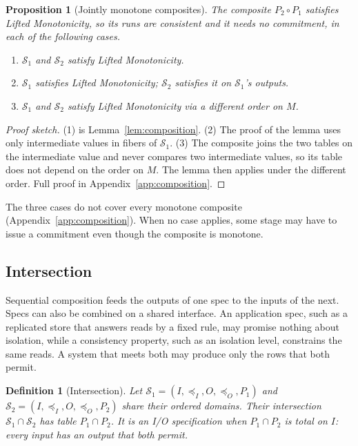 \documentclass[sigconf]{cidr-2027}
\newtheorem{proposition}{Proposition}
\newtheorem{definition}{Definition}
\theoremstyle{remark}
\newcommand{\InputOrd}{\preceq_I}
\newcommand{\OutputOrd}{\preceq_O}
\newcommand{\commitment}{commitment\xspace}
\newcommand{\Spec}{\mathcal{S}}
\newcommand{\spectype}[1][]{I/O specification#1\xspace}
\begin{document}
\begin{proposition}[Jointly monotone composites]
\label{prop:joint-monotone}
The composite $P_2\circ P_1$ satisfies Lifted Monotonicity, so its runs are
consistent and it needs no \commitment, in each of the following cases.
\begin{enumerate}
\item
$\Spec_1$ and $\Spec_2$ satisfy Lifted Monotonicity.
\item
$\Spec_1$ satisfies Lifted Monotonicity; $\Spec_2$ satisfies it on
        $\Spec_1$'s outputs.
\item
$\Spec_1$ and $\Spec_2$ satisfy Lifted Monotonicity via a different order
        on $M$.
\end{enumerate}
\end{proposition}

\begin{proof}[Proof sketch]
(1) is Lemma~\ref{lem:composition}. (2) The proof of the lemma uses only
intermediate values in fibers of $\Spec_1$. (3) The composite joins the two
tables on the intermediate value and never compares two intermediate values, so
its table does not depend on the order on $M$. The lemma then applies under
the different order. Full proof in Appendix~\ref{app:composition}.
\end{proof}

The three cases do not cover every monotone composite
(Appendix~\ref{app:composition}). When no case applies, some stage may have to issue a \commitment even though the composite is monotone.

\subsection{Intersection}
\label{sec:intersection}

Sequential composition feeds the outputs of one spec to the inputs of the
next. Specs can also be combined on a shared interface. An application spec,
such as a replicated store that answers reads by a fixed rule, may promise
nothing about isolation, while a consistency property, such as an isolation
level, constrains the same reads. A system that meets both may produce only
the rows that both permit.

\begin{definition}[Intersection]
\label{def:intersection}
Let $\Spec_1=(I,\InputOrd,O,\OutputOrd,P_1)$ and
$\Spec_2=(I,\InputOrd,O,\OutputOrd,P_2)$ share their ordered domains. Their
\emph{intersection} $\Spec_1\cap\Spec_2$ has table $P_1\cap P_2$. It is an
\spectype when $P_1\cap P_2$ is total on $I$: every input has an output that
both permit.
\end{definition}
\end{document}
